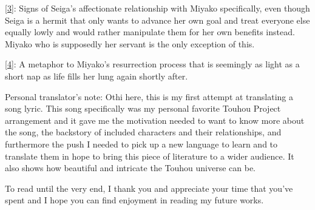 \documentclass{article}
\newcommand{\tlnoteref}[1]{\hypertarget{#1tonote}{}\hyperlink{#1}{[#1]}}
\begin{document}
\tlnoteref{3}: Signs of Seiga's affectionate relationship with Miyako specifically, even though Seiga is a hermit that only wants to advance her own goal and treat everyone else equally lowly and would rather manipulate them for her own benefits instead. Miyako who is supposedly her servant is the only exception of this.

\tlnoteref{4}: A metaphor to Miyako's resurrection process that is seemingly as light as a short nap as life fills her lung again shortly after.

Personal translator's note: Othi here, this is my first attempt at translating a song lyric. This song specifically was my personal favorite Touhou Project arrangement and it gave me the motivation needed to want to know more about the song, the backstory of included characters and their relationships, and furthermore the push I needed to pick up a new language to learn and to translate them in hope to bring this piece of literature to a wider audience. It also shows how beautiful and intricate the Touhou universe can be.

To read until the very end, I thank you and appreciate your time that you've spent and I hope you can find enjoyment in reading my future works.
\end{document}
